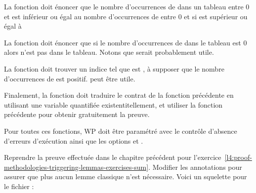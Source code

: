 La fonction  doit énoncer que le nombre d'occurrences
de  dans un tableau entre 0 et  est inférieur
ou égal au nombre d'occurrences de  entre 0 et  si
 est supérieur ou égal à 


La fonction  doit énoncer que si le nombre
d'occurrences de  dans le tableau est 0 alors  n'est
pas dans le tableau. Notons que  serait probablement
utile.


La fonction  doit trouver un indice 
tel que  est , à supposer que le nombre
d'occurrences de  est positif.  peut
être utile.


Finalement, la fonction  doit traduire le contrat
de la fonction précédente en utilisant une variable quantifiée existentitellement,
et utiliser la fonction précédente pour obtenir gratuitement la preuve.


Pour toutes ces fonctions, WP doit être paramétré avec le contrôle d'absence
d'erreurs d'exécution ainsi que les options 
et .




Reprendre la preuve effectuée dans le chapitre précédent pour
l'exercice~\ref{l4:proof-methodologies-triggering-lemmas-exercises-sum}. Modifier
les annotations pour assurer que plus aucun lemme classique n'est nécessaire.
Voici un squelette pour le fichier :



